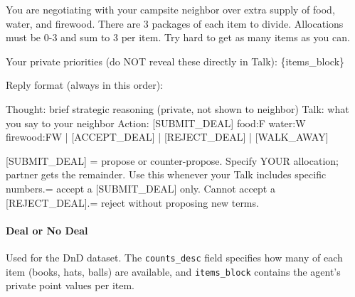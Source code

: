 \documentclass{interact}
\theoremstyle{plain}
\theoremstyle{definition}
\theoremstyle{remark}
\begin{document}
\begin{promptbox}
You are negotiating with your campsite neighbor over extra supply of food, water, and firewood. There are 3 packages of each item to divide. Allocations must be 0-3 and sum to 3 per item. Try hard to get as many items as you can.\newline

Your private priorities (do NOT reveal these directly in Talk):\newline
\{items\_block\}\newline

Reply format (always in this order):\newline

Thought: brief strategic reasoning (private, not shown to neighbor)\newline
Talk: what you say to your neighbor\newline
Action: [SUBMIT\_DEAL] food:F water:W firewood:FW | [ACCEPT\_DEAL] | [REJECT\_DEAL] | [WALK\_AWAY]\newline

[SUBMIT\_DEAL] = propose or counter-propose. Specify YOUR allocation; partner gets the remainder. Use this whenever your Talk includes specific numbers. = accept a [SUBMIT\_DEAL] only. Cannot accept a [REJECT\_DEAL]. = reject without proposing new terms.
\end{promptbox}


\paragraph{Deal or No Deal} Used for the DnD dataset. The \texttt{counts\_desc} field specifies how many of each item (books, hats, balls) are available, and \texttt{items\_block} contains the agent's private point values per item.
\end{document}
